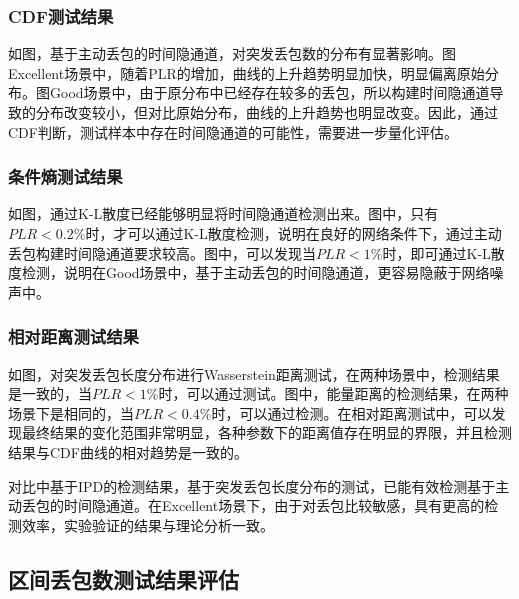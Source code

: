 \subsubsection{CDF测试结果}
\label{chap:analyze:result:burst:cdf}

如图，基于主动丢包的时间隐通道，对突发丢包数的分布有显著影响。图Excellent场景中，随着PLR的增加，曲线的上升趋势明显加快，明显偏离原始分布。图Good场景中，由于原分布中已经存在较多的丢包，所以构建时间隐通道导致的分布改变较小，但对比原始分布，曲线的上升趋势也明显改变。因此，通过CDF判断，测试样本中存在时间隐通道的可能性，需要进一步量化评估。

\subsubsection{条件熵测试结果}
\label{chap:analyze:result:burst:kld}

如图，通过K-L散度已经能够明显将时间隐通道检测出来。图中，只有$PLR<0.2\%$时，才可以通过K-L散度检测，说明在良好的网络条件下，通过主动丢包构建时间隐通道要求较高。图中，可以发现当$PLR<1\%$时，即可通过K-L散度检测，说明在Good场景中，基于主动丢包的时间隐通道，更容易隐蔽于网络噪声中。

\subsubsection{相对距离测试结果}
\label{chap:analyze:result:burst:distance}

如图，对突发丢包长度分布进行Wasserstein距离测试，在两种场景中，检测结果是一致的，当$PLR<1\%$时，可以通过测试。图中，能量距离的检测结果，在两种场景下是相同的，当$PLR<0.4\%$时，可以通过检测。在相对距离测试中，可以发现最终结果的变化范围非常明显，各种参数下的距离值存在明显的界限，并且检测结果与CDF曲线的相对趋势是一致的。

对比中基于IPD的检测结果，基于突发丢包长度分布的测试，已能有效检测基于主动丢包的时间隐通道。在Excellent场景下，由于对丢包比较敏感，具有更高的检测效率，实验验证的结果与理论分析一致。

\subsection{区间丢包数测试结果评估}
\label{chap:analyze:result:window}

